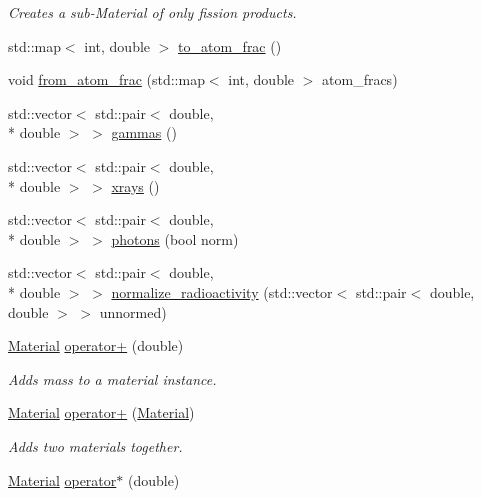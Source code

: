 \begin{DoxyCompactItemize}
\begin{DoxyCompactList}\small\item\em Creates a sub-\/\-Material of only fission products. \end{DoxyCompactList}\item 
std\-::map$<$ int, double $>$ \hyperlink{classpyne_1_1_material_a89a5ef5a4bfca961981a46a4252299fd}{to\-\_\-atom\-\_\-frac} ()
\item 
void \hyperlink{classpyne_1_1_material_a2db9572599c20eb0d17bd0993766f792}{from\-\_\-atom\-\_\-frac} (std\-::map$<$ int, double $>$ atom\-\_\-fracs)
\item 
std\-::vector$<$ std\-::pair$<$ double, \\*
double $>$ $>$ \hyperlink{classpyne_1_1_material_a2e2721b8ec8fde2d2e08379b39220d00}{gammas} ()
\item 
std\-::vector$<$ std\-::pair$<$ double, \\*
double $>$ $>$ \hyperlink{classpyne_1_1_material_a24fbf883f1623dccc4053106041510d5}{xrays} ()
\item 
std\-::vector$<$ std\-::pair$<$ double, \\*
double $>$ $>$ \hyperlink{classpyne_1_1_material_a3630f6f54a7ff6355da0b76b4d0e35a1}{photons} (bool norm)
\item 
std\-::vector$<$ std\-::pair$<$ double, \\*
double $>$ $>$ \hyperlink{classpyne_1_1_material_a114deb10e8d118bbd37ade0fbce5253d}{normalize\-\_\-radioactivity} (std\-::vector$<$ std\-::pair$<$ double, double $>$ $>$ unnormed)
\item 
\hypertarget{classpyne_1_1_material_a97bae8b18322f26e1cd87d8909ce42b6}{\hyperlink{classpyne_1_1_material}{Material} \hyperlink{classpyne_1_1_material_a97bae8b18322f26e1cd87d8909ce42b6}{operator+} (double)}\label{classpyne_1_1_material_a97bae8b18322f26e1cd87d8909ce42b6}

\begin{DoxyCompactList}\small\item\em Adds mass to a material instance. \end{DoxyCompactList}\item 
\hypertarget{classpyne_1_1_material_a1913e1a1b525352bf4f0b4155b6d39b7}{\hyperlink{classpyne_1_1_material}{Material} \hyperlink{classpyne_1_1_material_a1913e1a1b525352bf4f0b4155b6d39b7}{operator+} (\hyperlink{classpyne_1_1_material}{Material})}\label{classpyne_1_1_material_a1913e1a1b525352bf4f0b4155b6d39b7}

\begin{DoxyCompactList}\small\item\em Adds two materials together. \end{DoxyCompactList}\item 
\hypertarget{classpyne_1_1_material_a6a924c97822bc791e0b47d4940c8bea3}{\hyperlink{classpyne_1_1_material}{Material} \hyperlink{classpyne_1_1_material_a6a924c97822bc791e0b47d4940c8bea3}{operator$\ast$} (double)}\label{classpyne_1_1_material_a6a924c97822bc791e0b47d4940c8bea3}


\end{DoxyCompactItemize}
